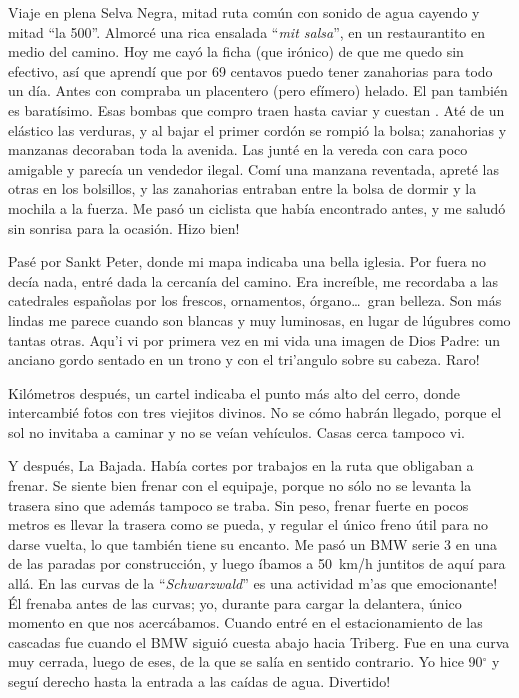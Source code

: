 Viaje en plena Selva Negra, mitad ruta com\'un con sonido de agua cayendo y
mitad ``la 500''. Almorc\'e una rica ensalada ``{\sl mit salsa}'', en un
restaurantito en medio del camino. Hoy me cay\'o la ficha (que ir\'onico) de
que me quedo sin efectivo, as\'i que aprend\'i que por 69 centavos puedo tener
zanahorias para todo un d\'ia. Antes con  compraba un
placentero (pero ef\'imero) helado. El pan tambi\'en es barat\'isimo. Esas
bombas que compro traen hasta caviar y cuestan . At\'e de un
el\'astico las verduras, y al bajar el primer cord\'on se rompi\'o la bolsa;
zanahorias y manzanas decoraban toda la avenida. Las junt\'e en la vereda con
cara poco amigable y parec\'ia un vendedor ilegal. Com\'i una manzana
reventada, apret\'e las otras en los bolsillos, y las zanahorias entraban entre
la bolsa de dormir y la mochila a la fuerza. Me pas\'o un ciclista que
hab\'ia encontrado antes, y me salud\'o sin sonrisa para la ocasi\'on.
\textexclamdown Hizo bien!

Pas\'e por Sankt Peter, donde mi mapa indicaba una bella iglesia. Por fuera no
dec\'ia nada, entr\'e dada la cercan\'ia del camino. Era incre\'ible, me
recordaba a las catedrales espa\~nolas por los frescos, ornamentos,
\'organo\ldots\ gran belleza. Son m\'as lindas me parece cuando son blancas y
muy luminosas, en lugar de l\'ugubres como tantas otras. Aqu'i vi por primera
vez en mi vida una imagen de Dios Padre: un anciano gordo sentado en un trono y
con el tri'angulo sobre su cabeza. \textexclamdown Raro!

Kil\'ometros despu\'es, un cartel indicaba el punto m\'as alto del cerro,
donde intercambi\'e fotos con tres viejitos divinos. No se c\'omo habr\'an
llegado, porque el sol no invitaba a caminar y no se ve\'ian veh\'iculos.
Casas cerca tampoco vi.

Y despu\'es, La Bajada. Hab\'ia cortes por trabajos en la ruta que obligaban a
frenar. Se siente bien frenar con el equipaje, porque no s\'olo no se levanta
la trasera sino que adem\'as tampoco se traba. Sin peso, frenar fuerte
en pocos metros es llevar la trasera como se pueda, y regular el \'unico freno
\'util para no darse vuelta, lo que tambi\'en tiene su encanto. Me pas\'o un
{\small BMW} serie 3 en una de las paradas por construcci\'on, y luego
\'ibamos a 50~km/h juntitos de aqu\'i para all\'a. \textexclamdown En las
curvas de la ``\emph{Schwarzwald}'' es una actividad m'as que emocionante!
\'El frenaba antes de las curvas; yo, durante para cargar la delantera, \'unico
momento en que nos acerc\'abamos. Cuando entr\'e en el estacionamiento de las
cascadas fue cuando el {\small BMW} sigui\'o cuesta abajo hacia Triberg. Fue en
una curva muy cerrada, luego de eses, de la que se sal\'ia en sentido contrario.
Yo hice 90$^\circ$ y segu\'i derecho hasta la entrada a las ca\'idas de agua.
\textexclamdown Divertido!

